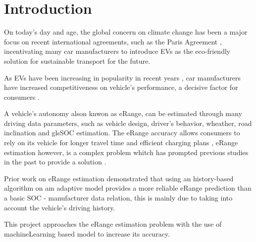 \chapter{Introduction}
\label{cha:introduction}

On today's day and age, the global concern on climate
change has been a major focus on recent international agreements,
such as the Paris Agreement \cite{parisAgreement},
incentivating many car manufacturers to introduce
\gls{EVs} as the eco-friendly
solution for sustainable transport for the future.


As \gls{EVs} have been increasing in popularity in
recent years , car manufacturers have
increased competitiveness on vehicle's performance,
a decisive factor for consumers \cite{EGBUE2012717}.


A vehicle's autonomy alson knwon as \gls{eRange},
can be estimated through many driving data parameters,
such as vehicle design, driver's behavior, wheather,
road inclination and gls{SOC} estimation.
The \gls{eRange} accuracy allows consumers to rely
on its vehicle for longer travel time and efficient
charging plans , \gls{eRange} estimation
however, is a complex problem whitch has prompted
previous studies in the past to provide a solution 
\cite{classicEVX, predictionOfeRange}.

Prior work \cite{classicEVX} on \gls{eRange}
estimation demonstrated that using an
history-based algorithm on am adaptive model
provides a more reliable \gls{eRange} prediction
than a basic \gls{SOC} - manufacturer data relation,
this is mainly due to taking into account the
vehicle's driving history.


This project approaches the \gls{eRange} estimation
problem with the use of \gls{machineLearning} based
model to increase its accuracy.

